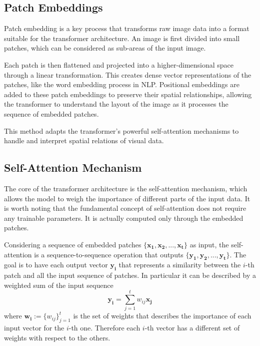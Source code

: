 \subsection{Patch Embeddings}
Patch embedding is a key process that transforms raw image data into a format 
suitable for the transformer architecture. An image is first divided into small 
patches, which can be considered as sub-areas of the input image. 

Each patch is then flattened and projected into a higher-dimensional space 
through a linear transformation. This creates dense vector representations of 
the patches, like the word embedding process in NLP. 
Positional embeddings are added to these patch embeddings to preserve their 
spatial relationships, allowing the transformer to understand the layout of the 
image as it processes the sequence of embedded patches. 

This method adapts the transformer's powerful self-attention mechanisms to 
handle and interpret spatial relations of visual data.


\subsection{Self-Attention Mechanism}
The core of the transformer architecture is the self-attention mechanism, which 
allows the model to weigh the importance of different parts of the input data.
It is worth noting that the fundamental concept of self-attention does not 
require any trainable parameters. It is actually computed only through the 
embedded patches.

Considering a sequence of embedded patches $\{\boldsymbol{x_1, x_2, ..., x_t}\}$ 
as input, the self-attention is a sequence-to-sequence operation that outputs
$\{\boldsymbol{y_1, y_2, ..., y_t}\}$. The goal is to have each output vector 
$\boldsymbol{y_i}$ that represents a similarity between the $i$-th 
patch and all the input sequence of patches. In particular it can be described by a  
weighted sum of the input sequence
\begin{equation}
\boldsymbol{y_i} = \sum_{j=1}^{t} w_{ij} \boldsymbol{x_j}
\label{eq:self_attention_output}
\end{equation}
where $\boldsymbol{w_i}:=\{w_{ij}\}_{j=1}^t$ is the set of weights that describes the importance 
of each input vector for the $i$-th one. 
Therefore each $i$-th vector has a different set of weights with respect to 
the others.

